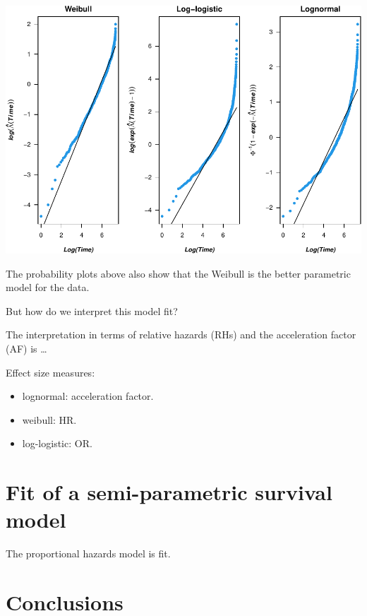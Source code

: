 \documentclass[
]{article}
\providecommand{\tightlist}{%
  \setlength{\itemsep}{0pt}\setlength{\parskip}{0pt}}
\begin{document}
\includegraphics{practical_files/figure-latex/cumhaz-plot-1.pdf}

The probability plots above also show that the Weibull is the better parametric model for the data.

But how do we interpret this model fit?

The interpretation in terms of relative hazards (RHs) and the acceleration factor (AF) is \ldots{}

Effect size measures:

\begin{itemize}
\tightlist
\item
  lognormal: acceleration factor.
\item
  weibull: HR.
\item
  log-logistic: OR.
\end{itemize}

\hypertarget{fit-of-a-semi-parametric-survival-model}{%
\section{Fit of a semi-parametric survival model}\label{fit-of-a-semi-parametric-survival-model}}

The proportional hazards model is fit.

\hypertarget{conclusions}{%
\section{Conclusions}\label{conclusions}}
\end{document}
